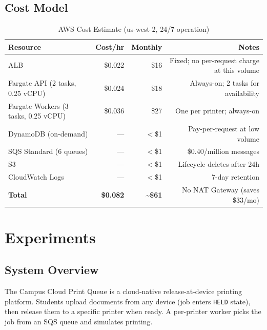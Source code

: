 \documentclass[11pt,letterpaper]{article}
\begin{document}
\subsection{Cost Model}

\begin{table}[H]
\centering
\caption{AWS Cost Estimate (us-west-2, 24/7 operation)}
\begin{tabular}{@{}lrrr@{}}
\toprule
\textbf{Resource} & \textbf{Cost/hr} & \textbf{Monthly} & \textbf{Notes} \\
\midrule
ALB                                & \$0.022 & \$16   & Fixed; no per-request charge at this volume \\
Fargate API (2 tasks, 0.25 vCPU)  & \$0.024 & \$18   & Always-on; 2 tasks for availability \\
Fargate Workers (3 tasks, 0.25 vCPU) & \$0.036 & \$27 & One per printer; always-on \\
DynamoDB (on-demand)              & ---     & $<$\$1 & Pay-per-request at low volume \\
SQS Standard (6 queues)          & ---     & $<$\$1 & \$0.40/million messages \\
S3                                & ---     & $<$\$1 & Lifecycle deletes after 24h \\
CloudWatch Logs                   & ---     & $<$\$1 & 7-day retention \\
\midrule
\textbf{Total}                    & \textbf{\$0.082} & \textbf{\textasciitilde\$61} & No NAT Gateway (saves \$33/mo) \\
\bottomrule
\end{tabular}
\end{table}


\section{Experiments}
\label{sec:experiments}

\subsection{System Overview}

The Campus Cloud Print Queue is a cloud-native release-at-device printing platform. Students upload documents from any device (job enters \texttt{HELD} state), then release them to a specific printer when ready. A per-printer worker picks the job from an SQS queue and simulates printing.
\end{document}
